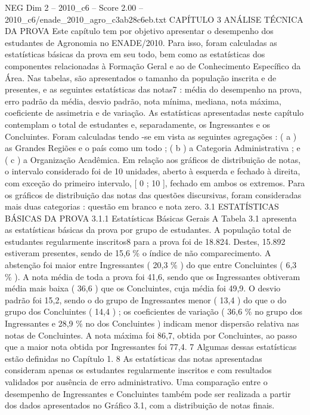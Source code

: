 \begin{textsample}{NEG Dim 2 – 2010\_c6 – Score 2.00 – 2010\_c6/enade\_2010\_agro\_c3ab28c6eb.txt}  \label{ex:f2_neg_253}
CAPÍTULO 3 ANÁLISE TÉCNICA DA PROVA Este capítulo tem por objetivo apresentar o desempenho dos estudantes de Agronomia no ENADE/2010.
Para isso, foram calculadas as estatísticas básicas da prova em seu todo, bem como as estatísticas dos componentes relacionadas à Formação Geral e ao de Conhecimento Específico da Área.
Nas tabelas, são apresentados o tamanho da população inscrita e de presentes, e as seguintes estatísticas das notas7 : média do desempenho na prova, erro padrão da média, desvio padrão, nota mínima, mediana, nota máxima, coeficiente de assimetria e de variação.
As estatísticas apresentadas neste capítulo contemplam o total de estudantes e, separadamente, os Ingressantes e os Concluintes.
Foram calculadas tendo -se em vista as seguintes agregações : ( a ) as Grandes Regiões e o país como um todo ; ( b ) a Categoria Administrativa ; e ( c ) a Organização Acadêmica.
Em relação aos gráficos de distribuição de notas, o intervalo considerado foi de 10 unidades, aberto à esquerda e fechado à direita, com exceção do primeiro intervalo, [ 0 ; 10 ], fechado em ambos os extremos.
Para os gráficos de distribuição das notas das questões discursivas, foram consideradas mais duas categorias : questão em branco e nota zero. 3.1 ESTATÍSTICAS BÁSICAS DA PROVA 3.1.1 Estatísticas Básicas Gerais A Tabela 3.1 apresenta as estatísticas básicas da prova por grupo de estudantes.
A população total de estudantes regularmente inscritos8 para a prova foi de 18.824.
Destes, 15.892 estiveram presentes, sendo de 15,6 \% o índice de não comparecimento.
A abstenção foi maior entre Ingressantes ( 20,3 \% ) do que entre Concluintes ( 6,3 \% ).
A nota média de toda a prova foi 41,6, sendo que os Ingressantes obtiveram média mais baixa ( 36,6 ) que os Concluintes, cuja média foi 49,9.
O desvio padrão foi 15,2, sendo o do grupo de Ingressantes menor ( 13,4 ) do que o do grupo dos Concluintes ( 14,4 ) ; os coeficientes de variação ( 36,6 \% no grupo dos Ingressantes e 28,9 \% no dos Concluintes ) indicam menor dispersão relativa nas notas de Concluintes.
A nota máxima foi 86,7, obtida por Concluintes, ao passo que a maior nota obtida por Ingressantes foi 77,4. 7 Algumas dessas estatísticas estão definidas no Capítulo 1. 8 As estatísticas das notas apresentadas consideram apenas os estudantes regularmente inscritos e com resultados validados por ausência de erro administrativo.
Uma comparação entre o desempenho de Ingressantes e Concluintes também pode ser realizada a partir dos dados apresentados no Gráfico 3.1, com a distribuição de notas finais.

\end{textsample}
